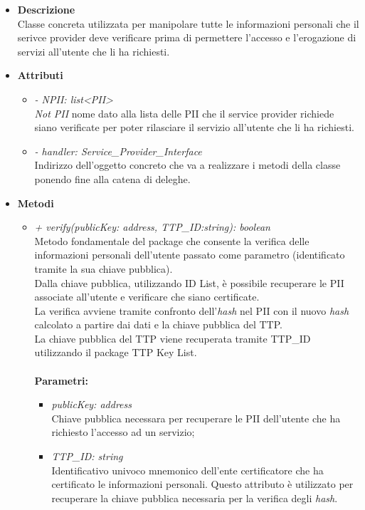 \begin{itemize}
	\item \textbf{Descrizione}\\
	Classe concreta utilizzata per manipolare tutte le informazioni personali che il serivce provider deve verificare prima di permettere l'accesso e l'erogazione di servizi all'utente che li ha richiesti.
	\item \textbf{Attributi}
	\begin{itemize}
		\item \textit{- NPII: list<PII>}\\
		\textit{Not PII} nome dato alla lista delle \gls{PII} che il service provider richiede siano verificate per poter rilasciare il servizio all'utente che li ha richiesti.
		\item \textit{- handler: Service\_Provider\_Interface}\\
		Indirizzo dell'oggetto concreto che va a realizzare i metodi della classe ponendo fine alla catena di deleghe.
	\end{itemize}
	\item \textbf{Metodi}
	\begin{itemize}
		\item \textit{+ verify(publicKey: address, TTP\_ID:string): boolean}\\
		Metodo fondamentale del package che consente la verifica delle informazioni personali dell'utente passato come parametro (identificato tramite la sua chiave pubblica).\\
		Dalla chiave pubblica, utilizzando ID List, è possibile recuperare le \gls{PII} associate all'utente e verificare che siano certificate.\\
		La verifica avviene tramite confronto dell'\textit{hash} nel \gls{PII} con il nuovo \textit{hash} calcolato a partire dai dati e la chiave pubblica del \gls{TTP}.\\
		La chiave pubblica del \gls{TTP} viene recuperata tramite TTP\_ID utilizzando il package TTP Key List.\\\\
		\textbf{Parametri:}
		\begin{itemize}
			\item \textit{publicKey: address}\\
			Chiave pubblica necessara per recuperare le \gls{PII} dell'utente che ha richiesto l'accesso ad un servizio;
			\item \textit{TTP\_ID: string}\\
			Identificativo univoco mnemonico dell'ente certificatore che ha certificato le informazioni personali. Questo attributo è utilizzato per recuperare la chiave pubblica necessaria per la verifica degli \textit{hash}.

\end{itemize}
\end{itemize}
\end{itemize}
